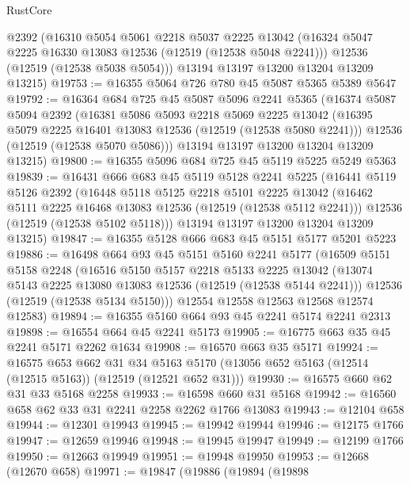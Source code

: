 \begin{lexlean}{RustCore}
\begin{coremodule}
      @2392
      (@16310
        @5054
        @5061
        @2218
        @5037
        @2225
        @13042
        (@16324 @5047 @2225 @16330 @13083 @12536 (@12519 (@12538 @5048 @2241)))
        @12536
        (@12519 (@12538 @5038 @5054)))
      @13194
      @13197
      @13200
      @13204
      @13209
      @13215)
@19753 := @16355 @5064 @726 @780 @45 @5087 @5365 @5389 @5647
@19792 := @16364
    @684
    @725
    @45
    @5087
    @5096
    @2241
    @5365
    (@16374
      @5087
      @5094
      @2392
      (@16381
        @5086
        @5093
        @2218
        @5069
        @2225
        @13042
        (@16395 @5079 @2225 @16401 @13083 @12536 (@12519 (@12538 @5080 @2241)))
        @12536
        (@12519 (@12538 @5070 @5086)))
      @13194
      @13197
      @13200
      @13204
      @13209
      @13215)
@19800 := @16355 @5096 @684 @725 @45 @5119 @5225 @5249 @5363
@19839 := @16431
    @666
    @683
    @45
    @5119
    @5128
    @2241
    @5225
    (@16441
      @5119
      @5126
      @2392
      (@16448
        @5118
        @5125
        @2218
        @5101
        @2225
        @13042
        (@16462 @5111 @2225 @16468 @13083 @12536 (@12519 (@12538 @5112 @2241)))
        @12536
        (@12519 (@12538 @5102 @5118)))
      @13194
      @13197
      @13200
      @13204
      @13209
      @13215)
@19847 := @16355 @5128 @666 @683 @45 @5151 @5177 @5201 @5223
@19886 := @16498
    @664
    @93
    @45
    @5151
    @5160
    @2241
    @5177
    (@16509
      @5151
      @5158
      @2248
      (@16516
        @5150
        @5157
        @2218
        @5133
        @2225
        @13042
        (@13074 @5143 @2225 @13080 @13083 @12536 (@12519 (@12538 @5144 @2241)))
        @12536
        (@12519 (@12538 @5134 @5150)))
      @12554
      @12558
      @12563
      @12568
      @12574
      @12583)
@19894 := @16355 @5160 @664 @93 @45 @2241 @5174 @2241 @2313
@19898 := @16554 @664 @45 @2241 @5173
@19905 := @16775 @663 @35 @45 @2241 @5171 @2262 @1634
@19908 := @16570 @663 @35 @5171
@19924 := @16575
    @653
    @662
    @31
    @34
    @5163
    @5170
    (@13056 @652 @5163 (@12514 (@12515 @5163)) (@12519 (@12521 @652 @31)))
@19930 := @16575 @660 @62 @31 @33 @5168 @2258
@19933 := @16598 @660 @31 @5168
@19942 := @16560 @658 @62 @33 @31 @2241 @2258 @2262 @1766 @13083
@19943 := @12104 @658
@19944 := @12301 @19943
@19945 := @19942 @19944
@19946 := @12175 @1766
@19947 := @12659 @19946
@19948 := @19945 @19947
@19949 := @12199 @1766
@19950 := @12663 @19949
@19951 := @19948 @19950
@19953 := @12668 (@12670 @658)
@19971 := @19847
    (@19886
      (@19894
        (@19898

\end{coremodule}
\end{lexlean}
